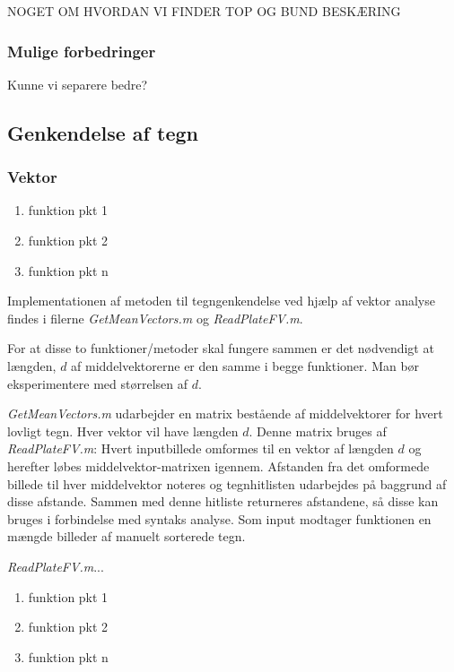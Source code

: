 NOGET OM HVORDAN VI FINDER TOP OG BUND BESKÆRING


\subsubsection{Mulige forbedringer}
Kunne vi separere bedre?

\subsection{Genkendelse af tegn}

\subsubsection{Vektor}

\begin{enumerate}
\item funktion pkt 1
\item funktion pkt 2
\item funktion pkt n
\end{enumerate}

Implementationen af metoden til tegngenkendelse ved hjælp af vektor analyse findes i filerne \textit{GetMeanVectors.m} og \textit{ReadPlateFV.m}.

For at disse to funktioner/metoder skal fungere sammen er det nødvendigt at længden, $d$ af middelvektorerne er den samme i begge funktioner. Man bør eksperimentere med størrelsen af $d$.

\textit{GetMeanVectors.m} udarbejder en matrix bestående af middelvektorer for hvert lovligt tegn. Hver vektor vil have længden $d$. Denne matrix bruges af \textit{ReadPlateFV.m}: Hvert inputbillede omformes til en vektor af længden $d$ og herefter løbes middelvektor-matrixen igennem. Afstanden fra det omformede billede til hver middelvektor noteres og tegnhitlisten udarbejdes på baggrund af disse afstande. Sammen med denne hitliste returneres afstandene, så disse kan bruges i forbindelse med syntaks analyse.
Som input modtager funktionen en mængde billeder af manuelt sorterede tegn.

\textit{ReadPlateFV.m}...

\begin{enumerate}
\item funktion pkt 1
\item funktion pkt 2
\item funktion pkt n
\end{enumerate}

